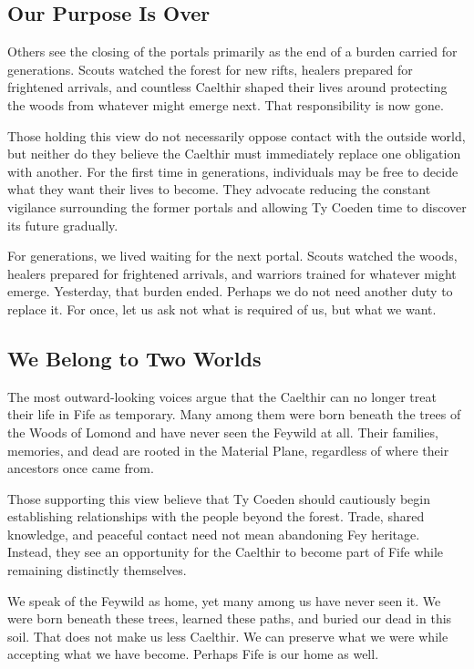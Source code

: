 \subsection*{Our Purpose Is Over}
{\entryfont Others see the closing of the portals primarily as the end of a burden carried for generations. Scouts watched the forest for new rifts, healers prepared for frightened arrivals, and countless Caelthir shaped their lives around protecting the woods from whatever might emerge next. That responsibility is now gone.

Those holding this view do not necessarily oppose contact with the outside world, but neither do they believe the Caelthir must immediately replace one obligation with another. For the first time in generations, individuals may be free to decide what they want their lives to become. They advocate reducing the constant vigilance surrounding the former portals and allowing Ty Coeden time to discover its future gradually.}
\begin{DndReadAloud}
	For generations, we lived waiting for the next portal. Scouts watched the woods, healers prepared for frightened arrivals, and warriors trained for whatever might emerge. Yesterday, that burden ended. Perhaps we do not need another duty to replace it. For once, let us ask not what is required of us, but what we want.
\end{DndReadAloud}
\subsection*{We Belong to Two Worlds}
{\entryfont The most outward-looking voices argue that the Caelthir can no longer treat their life in Fife as temporary. Many among them were born beneath the trees of the Woods of Lomond and have never seen the Feywild at all. Their families, memories, and dead are rooted in the Material Plane, regardless of where their ancestors once came from.

Those supporting this view believe that Ty Coeden should cautiously begin establishing relationships with the people beyond the forest. Trade, shared knowledge, and peaceful contact need not mean abandoning Fey heritage. Instead, they see an opportunity for the Caelthir to become part of Fife while remaining distinctly themselves.}
\begin{DndReadAloud}
	We speak of the Feywild as home, yet many among us have never seen it. We were born beneath these trees, learned these paths, and buried our dead in this soil. That does not make us less Caelthir. We can preserve what we were while accepting what we have become. Perhaps Fife is our home as well.
\end{DndReadAloud}
